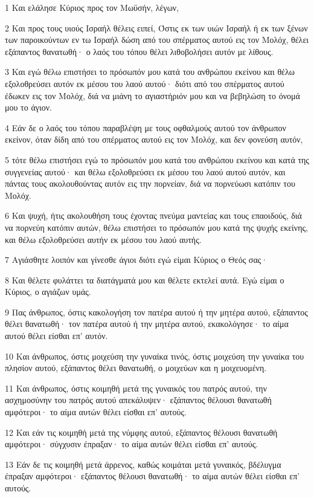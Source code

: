\par 1 Και ελάλησε Κύριος προς τον Μωϋσήν, λέγων,
\par 2 Και προς τους υιούς Ισραήλ θέλεις ειπεί, Όστις εκ των υιών Ισραήλ ή εκ των ξένων των παροικούντων εν τω Ισραήλ δώση από του σπέρματος αυτού εις τον Μολόχ, θέλει εξάπαντος θανατωθή· ο λαός του τόπου θέλει λιθοβολήσει αυτόν με λίθους.
\par 3 Και εγώ θέλω επιστήσει το πρόσωπόν μου κατά του ανθρώπου εκείνου και θέλω εξολοθρεύσει αυτόν εκ μέσου του λαού αυτού· διότι από του σπέρματος αυτού έδωκεν εις τον Μολόχ, διά να μιάνη το αγιαστήριόν μου και να βεβηλώση το όνομά μου το άγιον.
\par 4 Εάν δε ο λαός του τόπου παραβλέψη με τους οφθαλμούς αυτού τον άνθρωπον εκείνον, όταν δίδη από του σπέρματος αυτού εις τον Μολόχ, και δεν φονεύση αυτόν,
\par 5 τότε θέλω επιστήσει εγώ το πρόσωπόν μου κατά του ανθρώπου εκείνου και κατά της συγγενείας αυτού· και θέλω εξολοθρεύσει εκ μέσου του λαού αυτού αυτόν, και πάντας τους ακολουθούντας αυτόν εις την πορνείαν, διά να πορνεύωσι κατόπιν του Μολόχ.
\par 6 Και ψυχή, ήτις ακολουθήση τους έχοντας πνεύμα μαντείας και τους επαοιδούς, διά να πορνεύη κατόπιν αυτών, θέλω επιστήσει το πρόσωπόν μου κατά της ψυχής εκείνης, και θέλω εξολοθρεύσει αυτήν εκ μέσου του λαού αυτής.
\par 7 Αγιάσθητε λοιπόν και γίνεσθε άγιοι διότι εγώ είμαι Κύριος ο Θεός σας·
\par 8 Και θέλετε φυλάττει τα διατάγματά μου και θέλετε εκτελεί αυτά. Εγώ είμαι ο Κύριος, ο αγιάζων υμάς.
\par 9 Πας άνθρωπος, όστις κακολογήση τον πατέρα αυτού ή την μητέρα αυτού, εξάπαντος θέλει θανατωθή· τον πατέρα αυτού ή την μητέρα αυτού, εκακολόγησε· το αίμα αυτού θέλει είσθαι επ' αυτόν.
\par 10 Και άνθρωπος, όστις μοιχεύση την γυναίκα τινός, όστις μοιχεύση την γυναίκα του πλησίον αυτού, εξάπαντος θέλει θανατωθή, ο μοιχεύων και η μοιχευομένη.
\par 11 Και άνθρωπος, όστις κοιμηθή μετά της γυναικός του πατρός αυτού, την ασχημοσύνην του πατρός αυτού απεκάλυψεν· εξάπαντος θέλουσι θανατωθή αμφότεροι· το αίμα αυτών θέλει είσθαι επ' αυτούς.
\par 12 Και εάν τις κοιμηθή μετά της νύμφης αυτού, εξάπαντος θέλουσι θανατωθή αμφότεροι· σύγχυσιν έπραξαν· το αίμα αυτών θέλει είσθαι επ' αυτούς.
\par 13 Εάν δε τις κοιμηθή μετά άρρενος, καθώς κοιμάται μετά γυναικός, βδέλυγμα έπραξαν αμφότεροι· εξάπαντος θέλουσι θανατωθή· το αίμα αυτών θέλει είσθαι επ' αυτούς.
